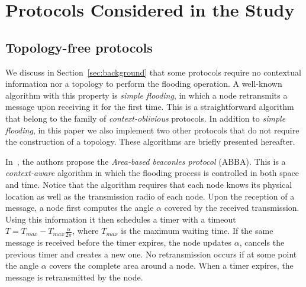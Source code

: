 
\section{Protocols Considered in the Study}
\label{sec:protocols}


\subsection*{Topology-free protocols}
We discuss in Section~\ref{sec:background} that some protocols require no contextual information nor a topology to perform the flooding operation.
A well-known algorithm with this property is \textit{simple flooding}, in which a node retransmits a message upon receiving it for the first time.
This is a straightforward algorithm that belong to the family of \textit{context-oblivious} protocols.
In addition to \textit{simple flooding}, in this paper we also implement two other protocols that do not require the construction of a topology.
These algorithms are briefly presented hereafter.

In~\cite{Ovalle-Martinez2006}, the authors propose the \textit{Area-based beaconles protocol} (ABBA).
This is a \textit{context-aware} algorithm in which the flooding process is controlled in both space and time.
Notice that the algorithm requires that each node knows its physical location as well as the transmission radio of each node.
Upon the reception of a message, a node first computes the angle $\alpha$ covered by the received transmission.
Using this information it then schedules a timer with a timeout $T = T_\textit{max} - T_\textit{max}\frac{\alpha}{2\pi}$, where $T_\textit{max}$ is the maximum waiting time.
If the same message is received before the timer expires, the node updates $\alpha$, cancels the previous timer and creates a new one.
No retransmission occurs if at some point the angle $\alpha$ covers the complete area around a node.
When a timer expires, the message is retransmitted by the node.

